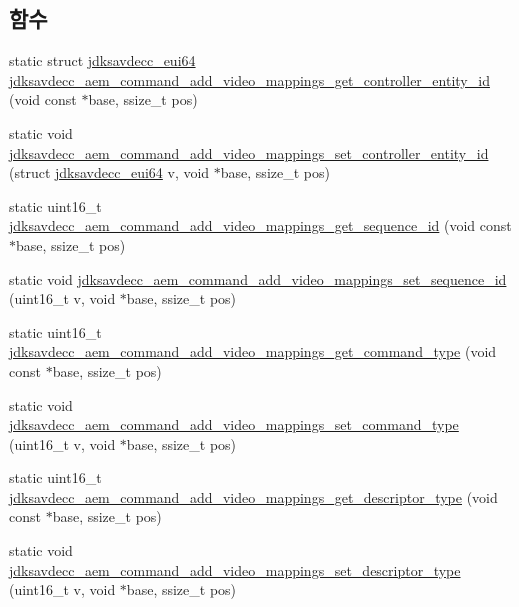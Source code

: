 \subsection*{함수}
\begin{DoxyCompactItemize}
\item 
static struct \hyperlink{structjdksavdecc__eui64}{jdksavdecc\+\_\+eui64} \hyperlink{group__command__add__video__mappings_ga09a37afc889828d3dc59b941287773fd}{jdksavdecc\+\_\+aem\+\_\+command\+\_\+add\+\_\+video\+\_\+mappings\+\_\+get\+\_\+controller\+\_\+entity\+\_\+id} (void const $\ast$base, ssize\+\_\+t pos)
\item 
static void \hyperlink{group__command__add__video__mappings_ga363fb3d77654598d0002f5ef6e153b2f}{jdksavdecc\+\_\+aem\+\_\+command\+\_\+add\+\_\+video\+\_\+mappings\+\_\+set\+\_\+controller\+\_\+entity\+\_\+id} (struct \hyperlink{structjdksavdecc__eui64}{jdksavdecc\+\_\+eui64} v, void $\ast$base, ssize\+\_\+t pos)
\item 
static uint16\+\_\+t \hyperlink{group__command__add__video__mappings_ga652750c591bb414322826e22145623e9}{jdksavdecc\+\_\+aem\+\_\+command\+\_\+add\+\_\+video\+\_\+mappings\+\_\+get\+\_\+sequence\+\_\+id} (void const $\ast$base, ssize\+\_\+t pos)
\item 
static void \hyperlink{group__command__add__video__mappings_ga3b96d24a699ef3522f6cd889d7055268}{jdksavdecc\+\_\+aem\+\_\+command\+\_\+add\+\_\+video\+\_\+mappings\+\_\+set\+\_\+sequence\+\_\+id} (uint16\+\_\+t v, void $\ast$base, ssize\+\_\+t pos)
\item 
static uint16\+\_\+t \hyperlink{group__command__add__video__mappings_ga84e38c77e3db1cae1b507ef39f6ec2cc}{jdksavdecc\+\_\+aem\+\_\+command\+\_\+add\+\_\+video\+\_\+mappings\+\_\+get\+\_\+command\+\_\+type} (void const $\ast$base, ssize\+\_\+t pos)
\item 
static void \hyperlink{group__command__add__video__mappings_ga60dc387893dd5130a2dd1f21b0dd8f46}{jdksavdecc\+\_\+aem\+\_\+command\+\_\+add\+\_\+video\+\_\+mappings\+\_\+set\+\_\+command\+\_\+type} (uint16\+\_\+t v, void $\ast$base, ssize\+\_\+t pos)
\item 
static uint16\+\_\+t \hyperlink{group__command__add__video__mappings_gabf6d1cf71ceb3a3fb8b9dc6aeb217dc5}{jdksavdecc\+\_\+aem\+\_\+command\+\_\+add\+\_\+video\+\_\+mappings\+\_\+get\+\_\+descriptor\+\_\+type} (void const $\ast$base, ssize\+\_\+t pos)
\item 
static void \hyperlink{group__command__add__video__mappings_ga9c3f04377c83c98312c4e661e98f13db}{jdksavdecc\+\_\+aem\+\_\+command\+\_\+add\+\_\+video\+\_\+mappings\+\_\+set\+\_\+descriptor\+\_\+type} (uint16\+\_\+t v, void $\ast$base, ssize\+\_\+t pos)

\end{DoxyCompactItemize}
